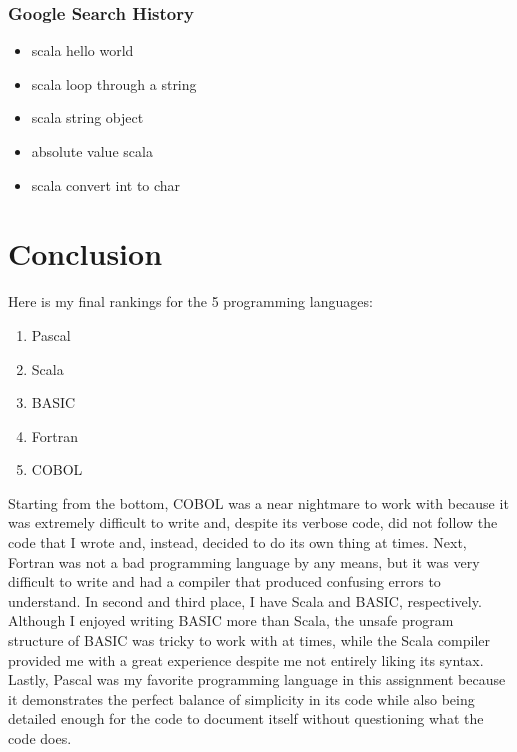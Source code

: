 \documentclass[letterpaper, 10pt, DIV=13]{scrartcl}
\numberwithin{equation}{section}
\numberwithin{figure}{section}
\numberwithin{table}{section}
\begin{document}
\subsubsection{Google Search History}
\begin{itemize}
	\item scala hello world
	\item scala loop through a string
	\item scala string object
	\item absolute value scala
	\item scala convert int to char
\end{itemize}

\section{Conclusion}
Here is my final rankings for the 5 programming languages:
\begin{enumerate}
	\item Pascal
	\item Scala
	\item BASIC
	\item Fortran
	\item COBOL
\end{enumerate}

Starting from the bottom, COBOL was a near nightmare to work with because it was extremely difficult to write and, despite its verbose code, did not follow the code that I wrote and, instead, decided to do its own thing at times. Next, Fortran was not a bad programming language by any means, but it was very difficult to write and had a compiler that produced confusing errors to understand. In second and third place, I have Scala and BASIC, respectively. Although I enjoyed writing BASIC more than Scala, the unsafe program structure of BASIC was tricky to work with at times, while the Scala compiler provided me with a great experience despite me not entirely liking its syntax. Lastly, Pascal was my favorite programming language in this assignment because it demonstrates the perfect balance of simplicity in its code while also being detailed enough for the code to document itself without questioning what the code does.
\end{document}
